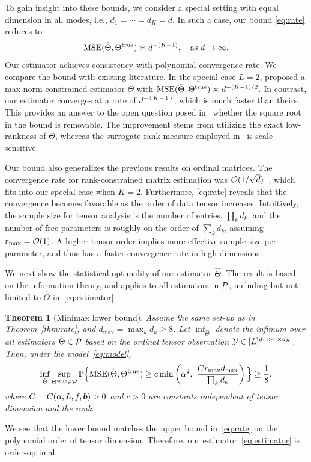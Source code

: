 \documentclass{article}
\theoremstyle{plain}
\newtheorem{thm}{Theorem}[section]
\theoremstyle{definition}
\begin{document}
To gain insight into these bounds, we consider a special setting with equal dimension in all modes, i.e., $d_1=\cdots=d_K=d$. In such a case, our bound \eqref{eq:rate} reduces to
\begin{equation}\label{eq:ours}
\text{MSE}(\hat \Theta, \Theta^{\text{true}}) \asymp d^{-(K-1)}, \quad \text{as}\ d\to \infty.
\end{equation}
Our estimator achieves consistency with polynomial convergence rate. We compare the bound with existing literature. In the special case $L=2$, \citep{ghadermarzy2018learning} proposed a max-norm constrained estimator $\tilde{\Theta}$ with $\text{MSE}(\tilde{\Theta}, \Theta^{\text{true}}) \asymp  d^{-(K-1)/2}$. In contrast, our estimator converges at a rate of $d^{-(K-1)}$, which is much faster than theirs. This provides an answer to the open question posed in~\citep{ghadermarzy2018learning} whether the square root in the bound is removable. The improvement stems from utilizing the exact low-rankness of $\Theta$, whereas the surrogate rank measure employed in~\citep{ghadermarzy2018learning} is scale-sensitive.

Our bound also generalizes the previous results on ordinal matrices. The convergence rate for rank-constrained matrix estimation was $\mathcal{O}(1/\sqrt{d})$~\citep{bhaskar2016probabilistic}, which fits into our special case when $K=2$. Furthermore, \eqref{eq:rate} reveals that the convergence becomes favorable as the order of data tensor increases. Intuitively, the sample size for tensor analysis is the number of entries, $\prod_k d_k$, and the number of free parameters is roughly on the order of $\sum_{k}d_k$, assuming $r_{\max}=\mathcal{O}(1)$. A higher tensor order implies more effective sample size per parameter, and thus has a faster convergence rate in high dimensions.


We next show the statistical optimality of our estimator $\hat \Theta$. The result is based on the information theory, and applies to all estimators in $\mathcal{P}$, including but not limited to $\hat \Theta$ in~\eqref{eq:estimator}.


\begin{thm}[Minimax lower bound]\label{thm:minimax}
Assume the same set-up as in Theorem~\ref{thm:rate}, and $d_{\max}=\max_k d_k \geq 8$. Let $\inf_{\hat \Theta}$ denote the infimum over all estimators $\hat \Theta\in\mathcal{P}$ based on the ordinal tensor observation $\mathcal{Y}\in[L]^{d_1\times \cdots \times d_K}$. Then, under the model~\eqref{eq:model},
\begin{align}\label{eq:lower}
\inf_{\hat \Theta }\sup_{\Theta^{\text{true}}\in\mathcal{P}} \mathbb{P}\Big\{ \text{MSE}(\hat \Theta, \Theta^{\text{true}}) 
\geq c\min\left( \alpha^2, \ { Cr_{\max}d_{\max} \over \prod_k d_k} \right) \Big\} \geq {1\over 8},
\end{align}
where $C=C(\alpha, L, f,\bm{b})>0$ and $c>0$ are constants independent of tensor dimension and the rank.
\end{thm}
We see that the lower bound matches the upper bound in~\eqref{eq:rate} on the polynomial order of tensor dimension. Therefore, our estimator~\eqref{eq:estimator} is order-optimal.
\vspace{-.2cm}
\end{document}
